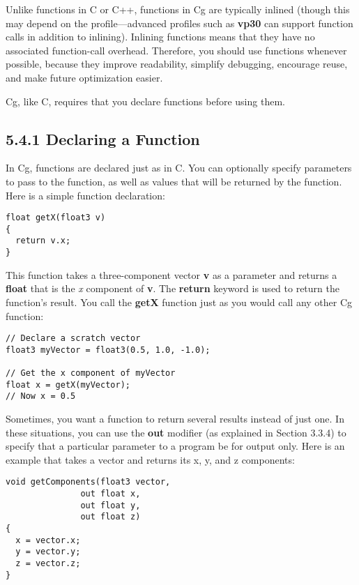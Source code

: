 \documentclass[../main.tex]{subfiles}
\begin{document}
Unlike functions in C or C++, functions in Cg are typically inlined (though this may depend on the profile—advanced profiles such as \textbf{vp30} can support function calls in addition to inlining). Inlining functions means that they have no associated function-call overhead. Therefore, you should use functions whenever possible, because they improve readability, simplify debugging, encourage reuse, and make future optimization easier.

Cg, like C, requires that you declare functions before using them.

\subsection{5.4.1 Declaring a Function}

In Cg, functions are declared just as in C. You can optionally specify parameters to pass to the function, as well as values that will be returned by the function. Here is a simple function declaration:

\FloatBarrier
\begin{lstlisting}
float getX(float3 v)
{
  return v.x;
}
\end{lstlisting}
\FloatBarrier

This function takes a three-component vector \textbf{v} as a parameter and returns a \textbf{float} that is the \textit{x} component of \textbf{v}. The \textbf{return} keyword is used to return the function's result. You call the \textbf{getX} function just as you would call any other Cg function:

\FloatBarrier
\begin{lstlisting}
// Declare a scratch vector
float3 myVector = float3(0.5, 1.0, -1.0);

// Get the x component of myVector
float x = getX(myVector);
// Now x = 0.5
\end{lstlisting}
\FloatBarrier

Sometimes, you want a function to return several results instead of just one. In these situations, you can use the \textbf{out} modifier (as explained in Section 3.3.4) to specify that a particular parameter to a program be for output only. Here is an example that takes a vector and returns its x, y, and z components:

\FloatBarrier
\begin{lstlisting}
void getComponents(float3 vector,
               out float x,
               out float y,
               out float z)
{
  x = vector.x;
  y = vector.y;
  z = vector.z;
}
\end{lstlisting}
\FloatBarrier
\end{document}
